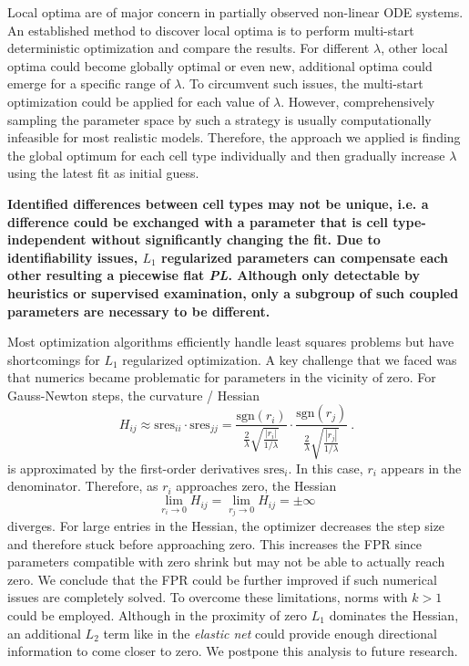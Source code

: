 \documentclass{bioinfo}
\begin{document}
Local optima are of major concern in partially observed non-linear ODE systems.
An established method to discover local optima is to perform multi-start deterministic optimization and compare the results.
For different $\lambda$, other local optima could become globally optimal or even new, additional optima could emerge for a specific range of $\lambda$.
To circumvent such issues, the multi-start optimization could be applied for each value of $\lambda$.
However, comprehensively sampling the parameter space by such a strategy is usually computationally infeasible for most realistic models.
Therefore, the approach we applied is finding the global optimum for each cell type individually and then gradually increase $\lambda$ using the latest fit as initial guess.

{\bf Identified differences between cell types may not be unique, i.e. a difference could be exchanged with a parameter that is cell type-independent without significantly changing the fit.
Due to identifiability issues, $L_1$ regularized parameters can compensate each other resulting a piecewise flat \emph{PL}.
Although only detectable by heuristics or supervised examination, only a subgroup of such coupled parameters are necessary to be different.}

Most optimization algorithms efficiently handle least squares problems but have shortcomings for $L_1$ regularized optimization.
A key challenge that we faced was that numerics became problematic for parameters in the vicinity of zero.
For Gauss-Newton steps, the curvature / Hessian
\begin{equation}
	H_{ij} \approx \text{sres}_{ii} \cdot \text{sres}_{jj} = \frac{\text{sgn}(r_i)}{\frac{2}{\lambda}\sqrt{\frac{|r_i|}{1/\lambda}}} \cdot \frac{\text{sgn}(r_j)}{\frac{2}{\lambda}\sqrt{\frac{|r_j|}{1/\lambda}}} \:.
\end{equation}
is approximated by the first-order derivatives $\text{sres}_{i}$.
In this case, $r_i$ appears in the denominator. Therefore, as $r_i$ approaches zero, the Hessian
\begin{equation}
	\lim_{r_i \rightarrow 0} H_{ij} = \lim_{r_j \rightarrow 0} H_{ij} = \pm \infty
\end{equation}
diverges.
For large entries in the Hessian, the optimizer decreases the step size and therefore stuck before approaching zero.
This increases the FPR since parameters compatible with zero shrink but may not be able to actually reach zero.
We conclude that the FPR could be further improved if such numerical issues are completely solved. %
To overcome these limitations, norms with $k>1$ could be employed.
Although in the proximity of zero $L_1$ dominates the Hessian, an additional $L_2$ term like in the \emph{elastic net} could provide enough directional information to come closer to zero.
We postpone this analysis to future research.
\end{document}
